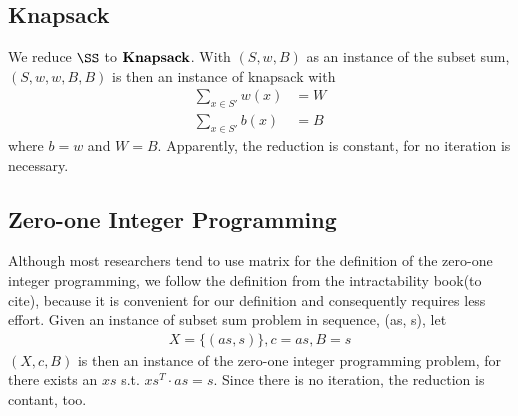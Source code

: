 \subsection{Knapsack}
We reduce $\SS$ to $\textbf{Knapsack}$. With $(S, w, B)$ as an instance of the subset sum, $(S, w, w, B, B)$
is then an instance of knapsack with 
\begin{align*}
    \sum_{x \in S'} w(x) &= W \\ 
    \sum_{x \in S'} b(x) &= B
\end{align*}
where $b = w$ and $W = B$. Apparently, the reduction is constant, for no iteration is necessary. 

\subsection{Zero-one Integer Programming}
Although most researchers tend to use matrix for the 
definition of the zero-one integer programming, we follow the definition from the intractability book(to cite), because 
it is convenient for our definition and consequently requires less effort. Given an instance of subset sum problem in sequence,
(as, s), let 
\begin{align*}
    X = \{(as, s)\}, c = as, B = s
\end{align*} 
$(X, c, B)$ is then an instance of the zero-one integer programming problem,
for there exists an $xs$ s.t. $xs^T \cdot as = s$. Since there is no iteration, the reduction is contant, too.

